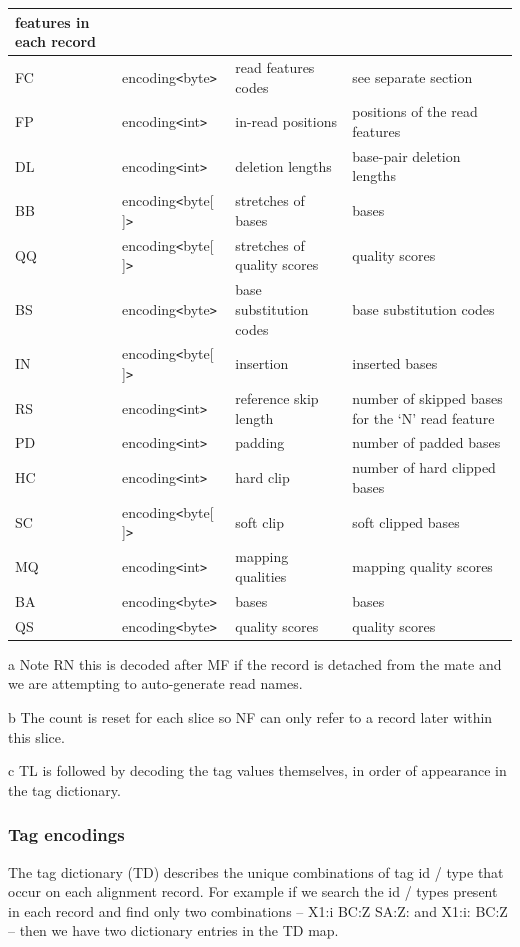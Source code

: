\documentclass[a4paper]{article}
\begin{document}
\begin{threeparttable}[t]
\begin{tabular}{|l|l|>{\raggedright}p{100pt}|>{\raggedright}p{220pt}|}
features in each record\tabularnewline
\hline
FC & encoding\texttt{<}byte\texttt{>} & read features codes & see separate section\tabularnewline
\hline
FP & encoding\texttt{<}int\texttt{>} & in-read positions & positions of the read
features\tabularnewline
\hline
DL & encoding\texttt{<}int\texttt{>} & deletion lengths & base-pair deletion lengths\tabularnewline
\hline
BB & encoding\texttt{<}byte[ ]\texttt{>} & stretches of bases & bases\tabularnewline
\hline
QQ & encoding\texttt{<}byte[ ]\texttt{>} & stretches of quality scores & quality scores\tabularnewline
\hline
BS & encoding\texttt{<}byte\texttt{>} & base substitution codes & base substitution
codes\tabularnewline
\hline
IN & encoding\texttt{<}byte[ ]\texttt{>} & insertion & inserted bases\tabularnewline
\hline
RS & encoding\texttt{<}int\texttt{>} & reference skip length & number of skipped 
bases for the `N' read feature\tabularnewline
\hline
PD & encoding\texttt{<}int\texttt{>} & padding & number of padded bases\tabularnewline
\hline
HC & encoding\texttt{<}int\texttt{>} & hard clip & number of hard clipped bases\tabularnewline
\hline
SC & encoding\texttt{<}byte[ ]\texttt{>} & soft clip & soft clipped bases\tabularnewline
\hline
MQ & encoding\texttt{<}int\texttt{>} & mapping qualities & mapping quality scores\tabularnewline
\hline
BA & encoding\texttt{<}byte\texttt{>} & bases & bases\tabularnewline
\hline
QS & encoding\texttt{<}byte\texttt{>} & quality scores & quality scores\tabularnewline
\hline
\end{tabular}

\begin{tablenotes}
\item[a] Note RN this is decoded after MF if the record is detached from the mate and we are attempting to auto-generate read names.
\item[b] The count is reset for each slice so NF can only refer to a record later within this slice.
\item[c] TL is followed by decoding the tag values themselves, in order of appearance in the tag dictionary.
\end{tablenotes}
\end{threeparttable}

\subsubsection*{Tag encodings}
\label{subsubsec:tags}

The tag dictionary (TD) describes the unique combinations of tag id / type that occur on each alignment record.
For example if we search the id / types present in each record and find only two combinations -- X1:i BC:Z SA:Z: and X1:i: BC:Z -- then we have two dictionary entries in the TD map.
\end{document}
